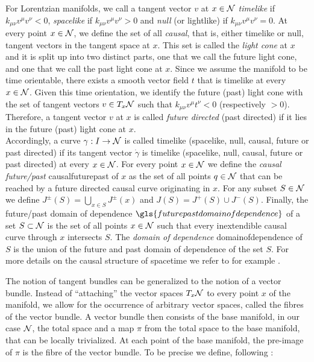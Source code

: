 For Lorentzian manifolds, we call a tangent vector $v$ at $x \in \mathcal{N}$ \emph{timelike} if $k_{\mu \nu} v^\mu v^\nu < 0$, \emph{spacelike} if $k_{\mu \nu} v^\mu v^\nu > 0$ and \emph{null} (or lightlike) if $k_{\mu \nu} v^\mu v^\nu = 0$. At every point $x \in \mathcal{N}$, we define the set of all \emph{causal}, that is, either timelike or null, tangent vectors in the tangent space at $x$. This set is called the \emph{light cone} at $x$ and it is split up into two distinct parts, one that we call the future light cone, and one that we call the past light cone at $x$. Since we assume the manifold to be time orientable, there exists a smooth vector field $t$ that is timelike at every $x \in \mathcal{N}$. Given this time orientation, we identify the future (past) light cone with the set of tangent vectors $v \in T_x\mathcal{N}$ such that $k_{\mu\nu} v^\mu t^\nu < 0$ (respectively $> 0$). Therefore, a tangent vector $v$ at $x$ is called \emph{future directed} (past directed) if it lies in the future (past) light cone at $x$.\\
Accordingly, a curve $\gamma : I \to \mathcal{N}$ is called timelike (spacelike, null, causal, future or past directed) if its tangent vector $\dot{\gamma}$ is timelike (spacelike, null, causal, future or past directed) at every $x \in \mathcal{N}$.  For every point $x \in \mathcal{N}$ we define the \emph{causal future/past} \gls{causalfuturepast} of $x$ as the set of all points $q \in \mathcal{N}$ that can be reached by a future directed causal curve originating in $x$. For any subset $S \in \mathcal{N}$ we define $J^\pm (S) = \bigcup_{x \in S} J^\pm(x)$ and $J(S) = J^+(S) \cup J^- (S)$. Finally, the future/past domain of dependence $\gls{futurepastdomainofdependence}$ of a set $S \subset \mathcal{N}$ is the set of all points $x \in \mathcal{N}$ such that every inextendible causal curve through $x$ intersects $S$. The \emph{domain of dependence} \gls{domainofdependence} of $S$ is the union of the future and past domain of dependence of the set $S$.
For more details on the causal structure of spacetime we refer to for example \cite[Chapter 8]{wald_GR}.\par
%
%
%
The notion of tangent bundles can be generalized to the notion of a vector bundle. Instead of ``attaching'' the vector spaces $T_x \mathcal{N}$ to every point $x$ of the manifold, we allow for the occurrence of arbitrary vector spaces, called the fibres of the vector bundle. A vector bundle then consists of the base manifold, in our case $\mathcal{N}$, the total space and a map $\pi$ from the total space to the base manifold, that can be locally trivialized. At each point of the base manifold, the pre-image of $\pi$ is the fibre of the vector bundle. To be precise we define, following \cite{rudolph_schmidt}:
